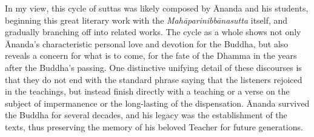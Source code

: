 \documentclass[12pt,openany]{book}%
\begin{document}
In my view, this cycle of suttas was likely composed by Ānanda and his students, beginning this great literary work with the \textit{\textsanskrit{Mahāparinibbānasutta}} itself, and gradually branching off into related works. The cycle as a whole shows not only Ānanda’s characteristic personal love and devotion for the Buddha, but also reveals a concern for what is to come, for the fate of the Dhamma in the years after the Buddha’s passing. One distinctive unifying detail of these discourses is that they do not end with the standard phrase saying that the listeners rejoiced in the teachings, but instead finish directly with a teaching or a verse on the subject of impermanence or the long-lasting of the dispensation. Ānanda survived the Buddha for several decades, and his legacy was the establishment of the texts, thus preserving the memory of his beloved Teacher for future generations.
\end{document}
